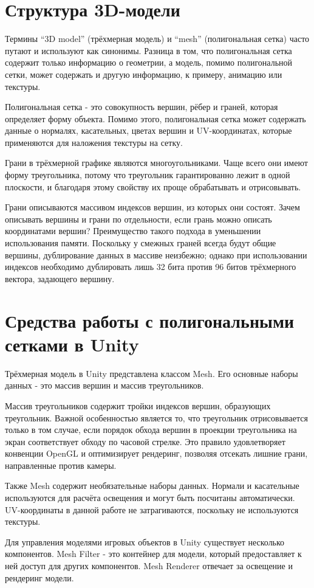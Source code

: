 \section{Структура 3D-модели}
Термины ``3D model'' (трёхмерная модель) и ``mesh'' (полигональная сетка) часто путают и используют как синонимы. Разница в том, что полигональная сетка содержит только информацию о геометрии, а модель, помимо полигональной сетки, может содержать и другую информацию, к примеру, анимацию или текстуры.

Полигональная сетка - это совокупность вершин, рёбер и граней, которая определяет форму объекта. Помимо этого, полигональная сетка может содержать данные о нормалях, касательных, цветах вершин и UV-координатах, которые применяются для наложения текстуры на сетку.

Грани в трёхмерной графике являются многоугольниками. Чаще всего они имеют форму треугольника, потому что треугольник гарантированно лежит в одной плоскости, и благодаря этому свойству их проще обрабатывать и отрисовывать. 

Грани описываются массивом индексов вершин, из которых они состоят. Зачем описывать вершины и грани по отдельности, если грань можно описать координатами вершин? Преимущество такого подхода в уменьшении использования памяти. Поскольку у смежных граней всегда будут общие вершины, дублирование данных в массиве неизбежно; однако при использовании индексов необходимо дублировать лишь 32 бита против 96 битов трёхмерного вектора, задающего вершину.

\section{Средства работы с полигональными сетками в Unity}
Трёхмерная модель в Unity представлена классом Mesh\cite{UnityMesh}. Его основные наборы данных - это массив вершин и массив треугольников.

Массив треугольников содержит тройки индексов вершин, образующих треугольник. Важной особенностью является то, что треугольник отрисовывается только в том случае, если порядок обхода вершин в проекции треугольника на экран соответствует обходу по часовой стрелке. Это правило удовлетворяет конвенции OpenGL и оптимизирует рендеринг, позволяя отсекать лишние грани, направленные против камеры.

Также Mesh содержит необязательные наборы данных. Нормали и касательные используются для расчёта освещения и могут быть посчитаны автоматически. UV-координаты в данной работе не затрагиваются, поскольку не используются текстуры.

Для управления моделями игровых объектов в Unity существует несколько компонентов. Mesh Filter - это контейнер для модели, который предоставляет к ней доступ для других компонентов. Mesh Renderer отвечает за освещение и рендеринг модели. 
\newpage
